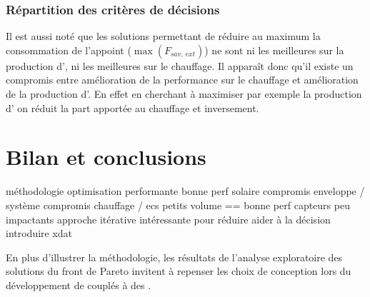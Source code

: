 \subsubsection{Répartition des critères de décisions} %
\label{ssub:repartition_des_criteres_de_decisions}
Il est aussi noté que les solutions permettant de réduire au maximum la
consommation de l’appoint ($\max(F_{sav,\,ext})$) ne sont ni les meilleures sur
la production d’, ni les meilleures sur le chauffage. Il apparaît donc
qu’il existe un compromis entre amélioration de la performance sur le chauffage et
amélioration de la production d’. En effet en cherchant à maximiser par exemple la production
d’ on réduit la part apportée au chauffage et inversement.










\section{Bilan et conclusions} %
\label{sec:bilan_et_conclusions}
méthodologie
optimisation performante
bonne perf solaire
compromis enveloppe / système
compromis chauffage / ecs
petits volume == bonne perf
capteurs peu impactants
approche itérative intéressante pour réduire aider à la décision
introduire xdat

En plus d’illustrer la
méthodologie, les résultats de l’analyse exploratoire des solutions du front de Pareto
invitent à repenser les choix de conception lors du développement de  couplés à
des .

